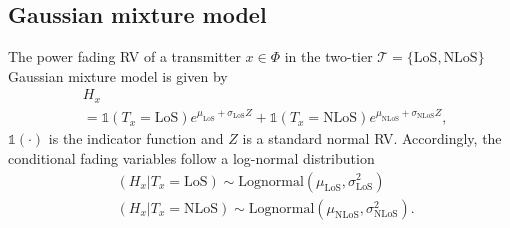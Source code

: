 \documentclass[conference]{IEEEtran}
\theoremstyle{definition}
\theoremstyle{plain}
\begin{document}
          \subsection{Gaussian mixture model}
          The power fading RV of a transmitter $x \in \Phi$  in the two-tier $\mathcal{T} = \{\text{LoS},\text{NLoS}\}$ Gaussian mixture model is given by
            \begin{align}
              &H_x  \nonumber \\
              &=   \mathds{1}(T_x =\text{LoS})e^{\mu_{\text{LoS}}+\sigma_{\text{LoS}}Z} +\mathds{1}(T_x =\text{NLoS})e^{\mu_{\text{NLoS}}+\sigma_{\text{NLoS}}Z},
            \end{align}
            $\mathds{1}(\cdot)$ is the indicator function and $Z$ is a standard normal RV. Accordingly, the conditional fading variables follow a log-normal distribution
            \begin{align}
              &(H_x|T_x=\text{LoS}) \sim \text{Lognormal}(\mu_{\text{LoS}},\sigma_{\text{LoS}}^2) \\
              &(H_x|T_x=\text{NLoS}) \sim \text{Lognormal}(\mu_{\text{NLoS}},\sigma_{\text{NLoS}}^2).
            \end{align}
            
            

            


          
         


         
         
             
             
\end{document}
